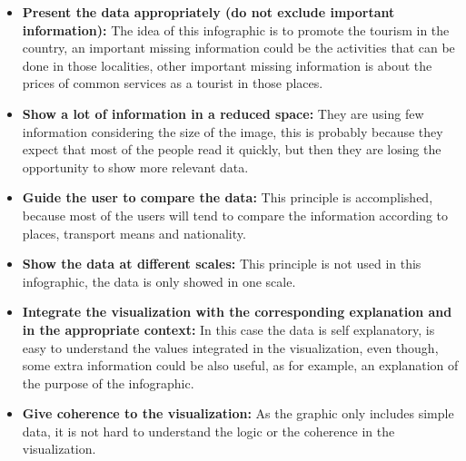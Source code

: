 \documentclass{article}
\begin{document}
\begin{description}
\begin{itemize}
      \item \textbf{Present the data appropriately (do not exclude important information):} The idea of this infographic is to promote the tourism in the country, an important missing information could be the activities that can be done in those localities, other important missing information is about the prices of common services as a tourist in those places.
      \item \textbf{Show a lot of information in a reduced space:} They are using few information considering the size of the image, this is probably because they expect that most of the people read it quickly, but then they are losing the opportunity to show more relevant data.
      \item \textbf{Guide the user to compare the data:} This principle is accomplished, because most of the users will tend to compare the information according to places, transport means and nationality.
      \item \textbf{Show the data at different scales:} This principle is not used in this infographic, the data is only showed in one scale.
      \item \textbf{Integrate the visualization with the corresponding explanation and in the appropriate context:} In this case the data is self explanatory, is easy to understand the values integrated in the visualization, even though, some extra information could be also useful, as for example, an explanation of the purpose of the infographic.
      \item \textbf{Give coherence to the visualization:} As the graphic only includes simple data, it is not hard to understand the logic or the coherence in the visualization.
    \end{itemize}


\end{description}
\end{document}
